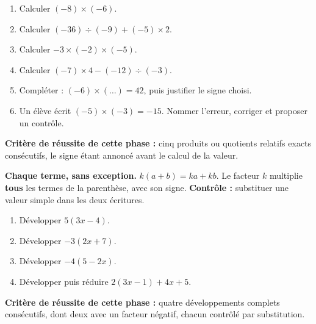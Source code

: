 \documentclass[10pt,a4paper]{article}
\begin{document}
\begin{enumerate}
\needspace{18mm}
\item Calculer $(-8)\times(-6)$.
\needspace{18mm}
\item Calculer $(-36)\div(-9) + (-5)\times 2$.
\needspace{18mm}
\item Calculer $-3 \times (-2) \times (-5)$.
\needspace{18mm}
\item Calculer $(-7)\times 4 - (-12)\div(-3)$.
\needspace{18mm}
\item Compléter : $(-6)\times(\ldots) = 42$, puis justifier le signe choisi.
\needspace{18mm}
\item Un élève écrit $(-5)\times(-3) = -15$. Nommer l'erreur, corriger et proposer un contrôle.
\end{enumerate}
\begin{successbox}\textbf{Critère de réussite de cette phase :} cinq produits ou quotients relatifs exacts consécutifs, le signe étant annoncé avant le calcul de la valeur.\end{successbox}
\certline
\needspace{62mm}\par\vspace{3mm}
\begin{methodbox}
\textbf{Chaque terme, sans exception.} $k(a + b) = ka + kb$. Le facteur $k$ multiplie \textbf{tous} les
termes de la parenthèse, avec son signe. \textbf{Contrôle :} substituer une valeur simple dans les deux écritures.
\end{methodbox}
\begin{enumerate}
\needspace{18mm}
\item Développer $5(3x - 4)$.
\needspace{18mm}
\item Développer $-3(2x + 7)$.
\needspace{18mm}
\item Développer $-4(5 - 2x)$.
\needspace{18mm}
\item Développer puis réduire $2(3x - 1) + 4x + 5$.
\end{enumerate}
\begin{successbox}\textbf{Critère de réussite de cette phase :} quatre développements complets consécutifs, dont deux avec un facteur négatif, chacun contrôlé par substitution.\end{successbox}
\certline
\needspace{62mm}\par\vspace{3mm}
\end{document}
